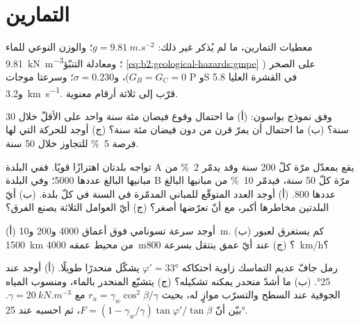 \section*{التمارين}\label{sec:b2:geological-hazards:exercises}

معطيات التمارين، ما لم يُذكر غير ذلك: $g = \qty{9.81}{m.s^{-2}}$؛ والوزن النوعي للماء
\qty{9.81}{kN.m^{-3}}؛ ومعادلة التنبّؤ \eqref{eq:b2:geological-hazards:gmpe} على الصخر ($G_B = G_C = 0$)،
و$\sigma = 0.230$؛ وسرعتا موجات P وS في القشرة العليا 5.8 و\qty{3.2}{km.s^{-1}}. قرّب إلى ثلاثة أرقام
معنوية.

\begin{exercise}[$\star$]\label{exo:b2:geological-hazards:1}
وفق نموذج بواسون: (أ) ما احتمال وقوع فيضان مئة سنة واحد على الأقلّ خلال 30 سنة؟
(ب) ما احتمال أن يمرّ قرن من دون فيضان مئة سنة؟ (ج) أوجد  للحركة التي لها فرصة \qty{5}{\percent} للتجاوز خلال 50 سنة.
\end{exercise}

\begin{exercise}[$\star$]\label{exo:b2:geological-hazards:2}
تواجه بلدتان اهتزازًا قويًا. ففي البلدة A يقع بمعدّل مرّة كلّ 200 سنة وقد
يدمّر \qty{2}{\percent} من مبانيها البالغ عددها 5000؛ وفي البلدة B مرّة كلّ 50 سنة، فيدمّر
\qty{10}{\percent} من مبانيها البالغ عددها 800. (أ) أوجد العدد المتوقّع للمباني المدمّرة في
السنة في كلّ بلدة. (ب) أيّ البلدتين مخاطرها أكبر، مع أنّ تعرّضها أصغر؟ (ج)
أيّ العوامل الثلاثة يصنع الفرق؟
\end{exercise}

\begin{exercise}[$\star$]\label{exo:b2:geological-hazards:3}
(أ) أوجد سرعة تسونامي فوق أعماق 4000 و200 و\qty{10}{m}. (ب) كم يستغرق
لعبور \qty{1500}{km} من محيط عمقه \qty{4000}{m}؟ (ج) عند أيّ عمق ينتقل بسرعة
\qty{800}{km/h}؟
\end{exercise}

\begin{exercise}[$\star$]\label{exo:b2:geological-hazards:4}
رمل جافّ عديم التماسك زاوية احتكاكه $\varphi' = \ang{33}$ يشكّل منحدرًا طويلًا. (أ) أوجد  عند \ang{25}. (ب) ما أشدّ منحدر يمكنه تشكيله؟ (ج) يتشبّع المنحدر بالماء،
ومنسوب المياه الجوفية عند السطح والتسرّب موازٍ له، بحيث $r_u = \gamma_w\cos^2\beta/\gamma$
مع $\gamma = \qty{20}{kN.m^{-3}}$. بيّن أنّ $F = (1 - \gamma_w/\gamma)\tan\varphi'/\tan\beta$،
ثم احسبه عند \ang{25}.
\end{exercise}

